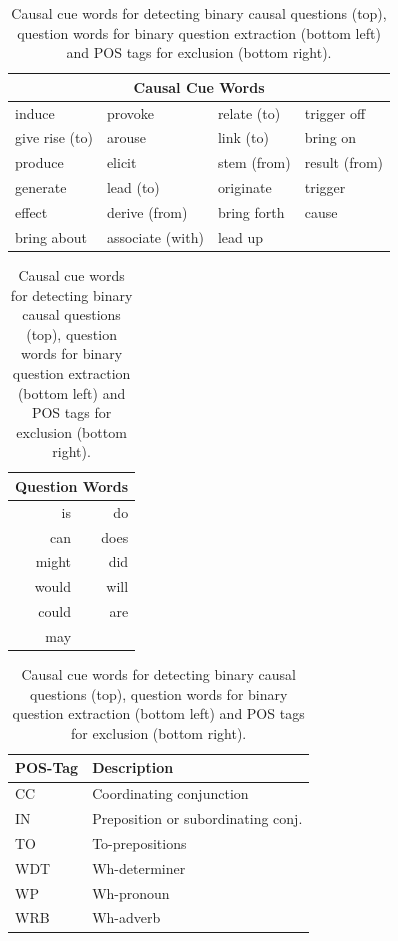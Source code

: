 \begin{table}[tb]
\caption{Causal cue words for detecting binary causal questions (top), question words for binary question extraction (bottom left) and POS tags for exclusion (bottom right).}
\renewcommand{\tabcolsep}{8.2pt}
\label{table-cue-words}
\centering
  \begin{tabular}{@{}llll@{}}
    \toprule
    \multicolumn{4}{c}{\textbf{Causal Cue Words}} \\
    \midrule
    induce         & provoke          & relate (to) & trigger off   \\
    give rise (to) & arouse           & link (to)   & bring on      \\
    produce        & elicit           & stem (from) & result (from) \\
    generate       & lead (to)        & originate   & trigger       \\
    effect         & derive (from)    & bring forth & cause         \\
    bring about    & associate (with) & lead up     &               \\
    \bottomrule
  \end{tabular}
  \renewcommand{\tabcolsep}{0pt}
  \begin{tabular}{@{}rr@{}}
    \toprule
    \multicolumn{2}{c}{\textbf{Question Words}} \\
    \midrule
    is    & do \\
    can   & does \\
    might & did \\
    would & will \\
    could & are \\
    may \\
    \bottomrule
  \end{tabular}
  \renewcommand{\tabcolsep}{3pt}
  \begin{tabular}{ll}
    \toprule
    \textbf{POS-Tag} & \textbf{Description} \\
    \midrule
    CC  & Coordinating conjunction \\
    IN  & Preposition or subordinating conj. \\
    TO  & To-prepositions \\
    WDT & Wh-determiner \\
    WP  & Wh-pronoun \\
    WRB & Wh-adverb \\
    \bottomrule
  \end{tabular}
\end{table}

